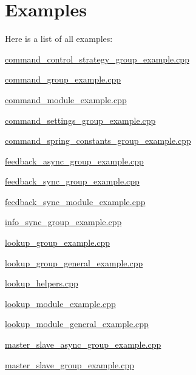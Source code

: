 \section{Examples}
Here is a list of all examples\+:\begin{DoxyCompactItemize}
\item 
\hyperlink{command_control_strategy_group_example_8cpp-example}{command\+\_\+control\+\_\+strategy\+\_\+group\+\_\+example.\+cpp}
\item 
\hyperlink{command_group_example_8cpp-example}{command\+\_\+group\+\_\+example.\+cpp}
\item 
\hyperlink{command_module_example_8cpp-example}{command\+\_\+module\+\_\+example.\+cpp}
\item 
\hyperlink{command_settings_group_example_8cpp-example}{command\+\_\+settings\+\_\+group\+\_\+example.\+cpp}
\item 
\hyperlink{command_spring_constants_group_example_8cpp-example}{command\+\_\+spring\+\_\+constants\+\_\+group\+\_\+example.\+cpp}
\item 
\hyperlink{feedback_async_group_example_8cpp-example}{feedback\+\_\+async\+\_\+group\+\_\+example.\+cpp}
\item 
\hyperlink{feedback_sync_group_example_8cpp-example}{feedback\+\_\+sync\+\_\+group\+\_\+example.\+cpp}
\item 
\hyperlink{feedback_sync_module_example_8cpp-example}{feedback\+\_\+sync\+\_\+module\+\_\+example.\+cpp}
\item 
\hyperlink{info_sync_group_example_8cpp-example}{info\+\_\+sync\+\_\+group\+\_\+example.\+cpp}
\item 
\hyperlink{lookup_group_example_8cpp-example}{lookup\+\_\+group\+\_\+example.\+cpp}
\item 
\hyperlink{lookup_group_general_example_8cpp-example}{lookup\+\_\+group\+\_\+general\+\_\+example.\+cpp}
\item 
\hyperlink{lookup_helpers_8cpp-example}{lookup\+\_\+helpers.\+cpp}
\item 
\hyperlink{lookup_module_example_8cpp-example}{lookup\+\_\+module\+\_\+example.\+cpp}
\item 
\hyperlink{lookup_module_general_example_8cpp-example}{lookup\+\_\+module\+\_\+general\+\_\+example.\+cpp}
\item 
\hyperlink{master_slave_async_group_example_8cpp-example}{master\+\_\+slave\+\_\+async\+\_\+group\+\_\+example.\+cpp}
\item 
\hyperlink{master_slave_group_example_8cpp-example}{master\+\_\+slave\+\_\+group\+\_\+example.\+cpp}
\end{DoxyCompactItemize}
